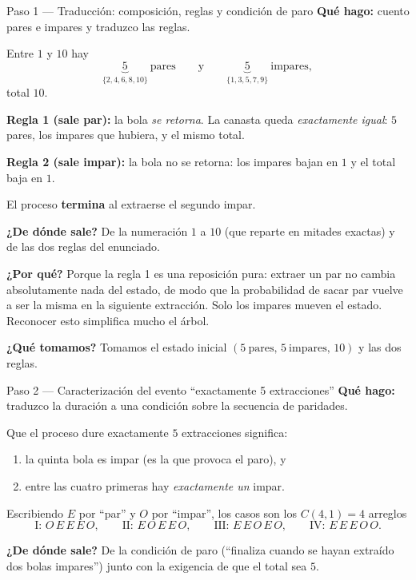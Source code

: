 \documentclass[11pt]{article}
\begin{document}
\begin{sol}

\begin{paso}{Paso 1 --- Traducci\'on: composici\'on, reglas y condici\'on de paro}
\textbf{Qu\'e hago:} cuento pares e impares y traduzco las reglas.

Entre $1$ y $10$ hay
\[
\underbrace{5}_{\{2,4,6,8,10\}}\ \text{pares}
\qquad\text{y}\qquad
\underbrace{5}_{\{1,3,5,7,9\}}\ \text{impares},
\]
total $10$.

\textbf{Regla 1 (sale par):} la bola \emph{se retorna}. La canasta queda \emph{exactamente igual}: $5$ pares, los impares que hubiera, y el mismo total.

\textbf{Regla 2 (sale impar):} la bola no se retorna: los impares bajan en $1$ y el total baja en $1$.

El proceso \textbf{termina} al extraerse el segundo impar.

\textbf{¿De d\'onde sale?} De la numeraci\'on $1$ a $10$ (que reparte en mitades exactas) y de las dos reglas del enunciado.

\textbf{¿Por qu\'e?} Porque la regla 1 es una reposici\'on pura: extraer un par no cambia absolutamente nada del estado, de modo que la probabilidad de sacar par vuelve a ser la misma en la siguiente extracci\'on. Solo los impares mueven el estado. Reconocer esto simplifica mucho el \'arbol.

\textbf{¿Qu\'e tomamos?} Tomamos el estado inicial $(5\ \text{pares},\,5\ \text{impares},\,10)$ y las dos reglas.
\end{paso}

\begin{paso}{Paso 2 --- Caracterizaci\'on del evento ``exactamente 5 extracciones''}
\textbf{Qu\'e hago:} traduzco la duraci\'on a una condici\'on sobre la secuencia de paridades.

Que el proceso dure exactamente $5$ extracciones significa:
\begin{enumerate}[leftmargin=*]
  \item la quinta bola es impar (es la que provoca el paro), y
  \item entre las cuatro primeras hay \emph{exactamente un} impar.
\end{enumerate}
Escribiendo $E$ por ``par'' y $O$ por ``impar'', los casos son los $C(4,1)=4$ arreglos
\[
\text{I: } O\,E\,E\,E\,O,
\qquad
\text{II: } E\,O\,E\,E\,O,
\qquad
\text{III: } E\,E\,O\,E\,O,
\qquad
\text{IV: } E\,E\,E\,O\,O .
\]

\textbf{¿De d\'onde sale?} De la condici\'on de paro (``finaliza cuando se hayan extra\'ido dos bolas impares'') junto con la exigencia de que el total sea $5$.


\end{paso}
\end{sol}
\end{document}
